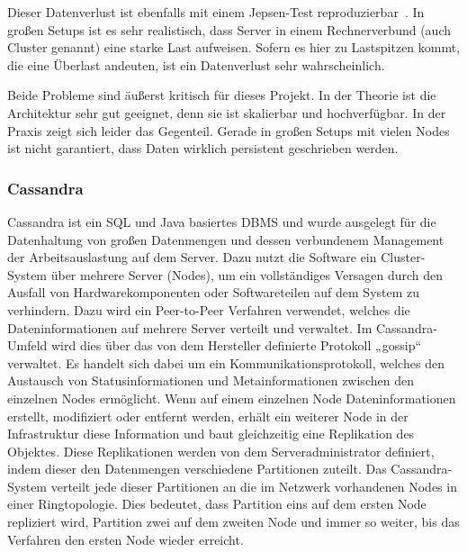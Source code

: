 Dieser Datenverlust ist ebenfalls mit einem Jepsen-Test
reproduzierbar~\cite{es_jepsen_pause}. In großen Setups ist es sehr
realistisch, dass Server in einem Rechnerverbund (auch Cluster genannt) eine
starke Last aufweisen. Sofern es hier zu Lastspitzen kommt, die eine Überlast
andeuten, ist ein Datenverlust sehr wahrscheinlich.

Beide Probleme sind äußerst kritisch für dieses Projekt. In der Theorie ist die
Architektur sehr gut geeignet, denn sie ist skalierbar und hochverfügbar. In
der Praxis zeigt sich leider das Gegenteil. Gerade in großen Setups mit vielen
Nodes ist nicht garantiert, dass Daten wirklich persistent geschrieben werden.
\tm%

\subsubsection{Cassandra}
\label{subsubsec:cassandra}
Cassandra ist ein \gls{SQL} und Java basiertes \gls{DBMS} und wurde ausgelegt
für die Datenhaltung von großen Datenmengen und dessen verbundenem
Management der Arbeitsauslastung auf dem Server. Dazu nutzt die Software ein
Cluster-System über mehrere Server (Nodes), um ein vollständiges Versagen durch
den Ausfall von Hardwarekomponenten oder Softwareteilen auf dem System zu
verhindern. Dazu wird ein \gls{Peer-to-Peer} Verfahren verwendet, welches die
Dateninformationen auf mehrere Server verteilt und verwaltet. Im
Cassandra-Umfeld wird dies über das von dem Hersteller definierte Protokoll
„gossip“ verwaltet. Es handelt sich dabei um ein Kommunikationsprotokoll,
welches den Austausch von Statusinformationen und Metainformationen zwischen den
einzelnen Nodes ermöglicht. Wenn auf einem einzelnen Node Dateninformationen
erstellt, modifiziert oder entfernt werden, erhält ein weiterer Node in der
Infrastruktur diese Information und baut gleichzeitig eine Replikation des
Objektes. Diese Replikationen werden von dem Serveradministrator definiert,
indem dieser den Datenmengen verschiedene \gls{Partitionen} zuteilt. Das
Cassandra-System verteilt jede dieser \gls{Partitionen} an die im Netzwerk
vorhandenen Nodes in einer \gls{Ringtopologie}. Dies bedeutet, dass Partition
eins auf dem ersten Node repliziert wird, Partition zwei auf dem zweiten Node
und immer so weiter, bis das Verfahren den ersten Node wieder erreicht.



